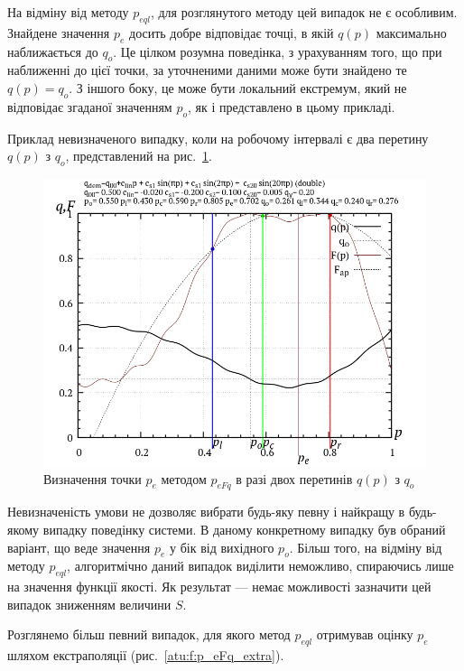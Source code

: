 На відміну від методу
$p_{eql}$, для розглянутого методу цей випадок не є
особливим. Знайдене значення
$p_e$ досить добре відповідає точці, в якій
$q(p)$ максимально наближається до
$q_o$. Це цілком розумна поведінка, з урахуванням того, що при
наближенні до цієї точки, за уточненими даними може бути
знайдено те
$q(p) = q_o$. З іншого боку, це може бути локальний екстремум, який
не відповідає згаданої значенням
$p_o$, як і представлено в цьому прикладі.

Приклад невизначеного випадку, коли на робочому інтервалі є
два перетину
$q(p)$ з
$q_o$, представлений на рис.~\ref{atu:f:p_eFq_double}.

\begin{figure}[htb!]
  \begin{center}
    \includegraphics[width=60\TW]{p/p_eFq/q_p_eFq_double.png}
  \end{center}
  \caption{Визначення точки $p_e$ методом $p_{eFq}$ в разі двох перетинів $q(p)$ з $q_o$}
  \label{atu:f:p_eFq_double}
\end{figure}

Невизначеність умови не дозволяє вибрати будь-яку певну і
найкращу в будь-якому випадку поведінку системи. В даному конкретному
випадку був обраний варіант, що веде значення $p_e$ у бік від вихідного
$p_o$. Більш того, на відміну від методу
$p_{eql}$, алгоритмічно даний випадок виділити неможливо,
спираючись лише на значення функції якості. Як результат ---
немає можливості зазначити цей випадок зниженням величини
$S$.

Розглянемо більш певний випадок, для якого метод
$p_{eql}$ отримував оцінку
$p_e$ шляхом екстраполяції (рис.~\ref{atu:f:p_eFq_extra}).

